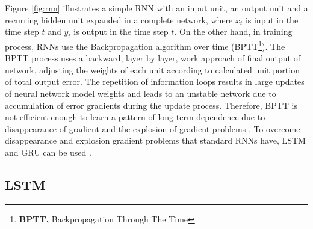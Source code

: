 Figure \ref{fig:rnn} illustrates a simple RNN with an input unit, an output unit and a recurring hidden unit expanded in a complete network, where $x_{t}$ is input in the time step $t$ and $y_{t}$ is output in the time step $t$. On the other hand, in training process, RNNs use the Backpropagation algorithm over time (BPTT\footnote{\textbf{BPTT,} Backpropagation Through The Time}). The BPTT process uses a backward, layer by layer, work approach of final output of network, adjusting the weights of each unit according to calculated unit portion of total output error. The repetition of information loops results in large updates of neural network model weights and leads to an unstable network due to accumulation of error gradients during the update process. Therefore, BPTT is not efficient enough to learn a pattern of long-term dependence due to disappearance of gradient and the explosion of gradient problems \cite{Reference50}. To overcome disappearance and explosion gradient problems that standard RNNs have, LSTM and GRU can be used \cite{Reference51}.

\subsection{LSTM}

